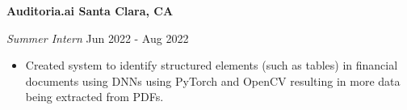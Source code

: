 \textbf{Auditoria.ai \hfill Santa Clara, CA}\par
\textit{Summer Intern} \hfill Jun 2022 - Aug 2022
\begin{itemize}
	\item Created system to identify structured elements (such as tables) in financial documents using DNNs using PyTorch and OpenCV resulting in more data being extracted from PDFs.
\end{itemize}\par
